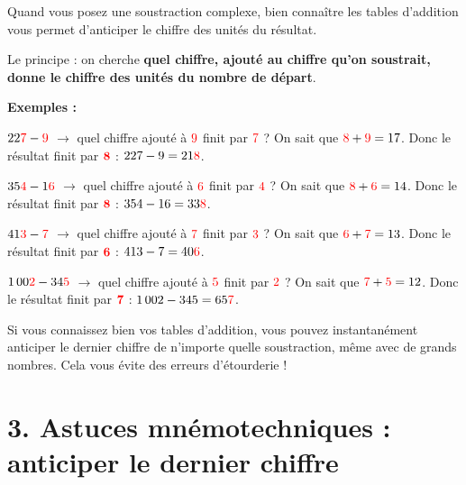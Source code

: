 \documentclass{exam}
\begin{document}
Quand vous posez une soustraction complexe, bien connaître les tables d'addition vous permet d'anticiper le chiffre des unités du résultat.

\vspace{0.5em}
Le principe : on cherche \textbf{quel chiffre, ajouté au chiffre qu'on soustrait, donne le chiffre des unités du nombre de départ}.

\vspace{0.5em}
\textbf{Exemples :}
\begin{compactitem}
\item $22\textcolor{red}{7} - \textcolor{red}{9}$ $\to$ quel chiffre ajouté à $\textcolor{red}{9}$ finit par $\textcolor{red}{7}$ ? On sait que $\textcolor{red}{8} + \textcolor{red}{9} = 17$. Donc le résultat finit par $\textcolor{red}{\textbf{8}}$ : $227 - 9 = 21\textcolor{red}{8}$.
\item $35\textcolor{red}{4} - 1\textcolor{red}{6}$ $\to$ quel chiffre ajouté à $\textcolor{red}{6}$ finit par $\textcolor{red}{4}$ ? On sait que $\textcolor{red}{8} + \textcolor{red}{6} = 14$. Donc le résultat finit par $\textcolor{red}{\textbf{8}}$ : $354 - 16 = 33\textcolor{red}{8}$.
\item $41\textcolor{red}{3} - \textcolor{red}{7}$ $\to$ quel chiffre ajouté à $\textcolor{red}{7}$ finit par $\textcolor{red}{3}$ ? On sait que $\textcolor{red}{6} + \textcolor{red}{7} = 13$. Donc le résultat finit par $\textcolor{red}{\textbf{6}}$ : $413 - 7 = 40\textcolor{red}{6}$.
\item $1\,00\textcolor{red}{2} - 34\textcolor{red}{5}$ $\to$ quel chiffre ajouté à $\textcolor{red}{5}$ finit par $\textcolor{red}{2}$ ? On sait que $\textcolor{red}{7} + \textcolor{red}{5} = 12$. Donc le résultat finit par $\textcolor{red}{\textbf{7}}$ : $1\,002 - 345 = 65\textcolor{red}{7}$.
\end{compactitem}

\vspace{0.5em}
Si vous connaissez bien vos tables d'addition, vous pouvez instantanément anticiper le dernier chiffre de n'importe quelle soustraction, même avec de grands nombres. Cela vous évite des erreurs d'étourderie !

\section*{\textcolor{blue!80!black}{3. Astuces mnémotechniques : anticiper le dernier chiffre}}
\end{document}
